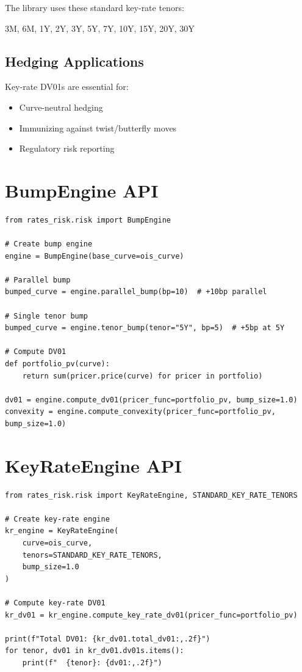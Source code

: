 \documentclass[12pt,a4paper]{report}
\begin{document}
The library uses these standard key-rate tenors:
\begin{center}
3M, 6M, 1Y, 2Y, 3Y, 5Y, 7Y, 10Y, 15Y, 20Y, 30Y
\end{center}

\subsection{Hedging Applications}

Key-rate DV01s are essential for:
\begin{itemize}
    \item Curve-neutral hedging
    \item Immunizing against twist/butterfly moves
    \item Regulatory risk reporting
\end{itemize}

\section{BumpEngine API}

\begin{lstlisting}
from rates_risk.risk import BumpEngine

# Create bump engine
engine = BumpEngine(base_curve=ois_curve)

# Parallel bump
bumped_curve = engine.parallel_bump(bp=10)  # +10bp parallel

# Single tenor bump
bumped_curve = engine.tenor_bump(tenor="5Y", bp=5)  # +5bp at 5Y

# Compute DV01
def portfolio_pv(curve):
    return sum(pricer.price(curve) for pricer in portfolio)

dv01 = engine.compute_dv01(pricer_func=portfolio_pv, bump_size=1.0)
convexity = engine.compute_convexity(pricer_func=portfolio_pv, bump_size=1.0)
\end{lstlisting}

\section{KeyRateEngine API}

\begin{lstlisting}
from rates_risk.risk import KeyRateEngine, STANDARD_KEY_RATE_TENORS

# Create key-rate engine
kr_engine = KeyRateEngine(
    curve=ois_curve,
    tenors=STANDARD_KEY_RATE_TENORS,
    bump_size=1.0
)

# Compute key-rate DV01
kr_dv01 = kr_engine.compute_key_rate_dv01(pricer_func=portfolio_pv)

print(f"Total DV01: {kr_dv01.total_dv01:,.2f}")
for tenor, dv01 in kr_dv01.dv01s.items():
    print(f"  {tenor}: {dv01:,.2f}")
\end{lstlisting}
\end{document}
